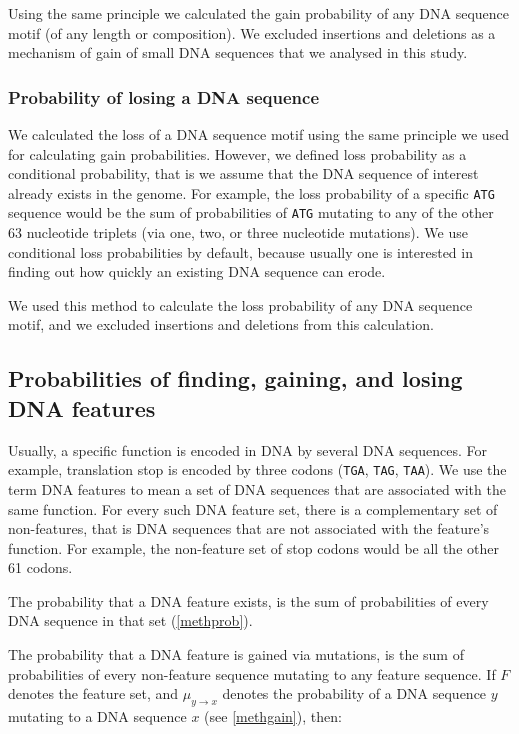 \documentclass[12pt,a4paper]{article}
\begin{document}
Using the same principle we calculated the gain probability of any DNA sequence motif (of any length or composition). We excluded insertions and deletions as a mechanism of gain of small DNA sequences that we analysed in this study. 

\subsubsection{Probability of losing a DNA sequence}

We calculated the loss of a DNA sequence motif using the same principle we used for calculating gain probabilities. However, we defined loss probability as a conditional probability, that is we assume that the DNA sequence of interest already exists in the genome. For example, the loss probability of a specific \texttt{ATG} sequence would be the sum of probabilities of \texttt{ATG} mutating to any of the other 63 nucleotide triplets (via one, two, or three nucleotide mutations). We use conditional loss probabilities by default, because usually one is interested in finding out how quickly an existing DNA sequence can erode.

We used this method to calculate the loss probability of any DNA sequence motif, and we excluded insertions and deletions from this calculation.

\subsection{Probabilities of finding, gaining, and losing DNA features}
\label{methfeatures}

Usually, a specific function is encoded in DNA by several DNA sequences. For example, translation stop is encoded by three codons (\texttt{TGA}, \texttt{TAG}, \texttt{TAA}). We use the term DNA features to mean a set of DNA sequences that are associated with the same function. For every such DNA feature set, there is a complementary set of non-features, that is DNA sequences that are not associated with the feature's function. For example, the non-feature set of stop codons would be all the other 61 codons. 

The probability that a DNA feature exists, is the sum of probabilities of every DNA sequence in that set (\autoref{methprob}).

The probability that a DNA feature is gained via mutations, is the sum of probabilities of every non-feature sequence mutating to any feature sequence. If $F$ denotes the feature set, and $\mu_{y\to x}$ denotes the probability of a DNA sequence $y$ mutating to a DNA sequence $x$ (see \autoref{methgain}), then:
\end{document}

